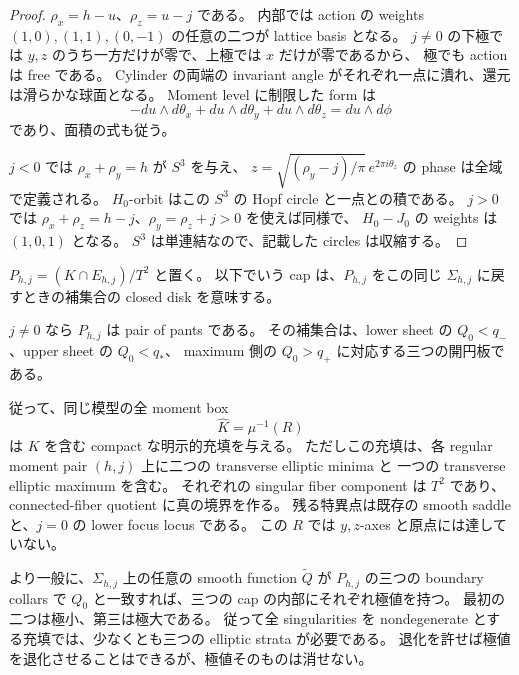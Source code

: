 \begin{proof}
$\rho_x=h-u$、$\rho_z=u-j$ である。
内部では action の weights $(1,0),(1,1),(0,-1)$ の任意の二つが lattice basis となる。
$j\ne0$ の下極では $y,z$ のうち一方だけが零で、上極では $x$ だけが零であるから、
極でも action は free である。
Cylinder の両端の invariant angle がそれぞれ一点に潰れ、還元は滑らかな球面となる。
Moment level に制限した form は
\[
 -du\wedge d\theta_x+du\wedge d\theta_y+du\wedge d\theta_z
 =du\wedge d\phi
\]
であり、面積の式も従う。

$j<0$ では $\rho_x+\rho_y=h$ が $S^3$ を与え、
$z=\sqrt{(\rho_y-j)/\pi}\,e^{2\pi i\theta_z}$ の phase は全域で定義される。
$H_0$-orbit はこの $S^3$ の Hopf circle と一点との積である。
$j>0$ では $\rho_x+\rho_z=h-j$、$\rho_y=\rho_z+j>0$ を使えば同様で、
$H_0-J_0$ の weights は $(1,0,1)$ となる。
$S^3$ は単連結なので、記載した circles は収縮する。
\end{proof}

$P_{h,j}=(K\cap E_{h,j})/T^2$ と置く。
以下でいう cap は、$P_{h,j}$ をこの同じ $\Sigma_{h,j}$ に戻すときの補集合の closed disk を意味する。

\begin{proposition}[明示的な充填と残る極値]\label{cf:three-caps}
$j\ne0$ なら $P_{h,j}$ は pair of pants である。
その補集合は、lower sheet の $Q_0<q_-$、upper sheet の $Q_0<q_*$、
maximum 側の $Q_0>q_+$ に対応する三つの開円板である。

従って、同じ模型の全 moment box
\[
 \widehat K=\mu^{-1}(R)
\]
は $K$ を含む compact な明示的充填を与える。
ただしこの充填は、各 regular moment pair $(h,j)$ 上に二つの transverse elliptic minima と
一つの transverse elliptic maximum を含む。
それぞれの singular fiber component は $T^2$ であり、connected-fiber quotient に真の境界を作る。
残る特異点は既存の smooth saddle と、$j=0$ の lower focus locus である。
この $R$ では $y,z$-axes と原点には達していない。

より一般に、$\Sigma_{h,j}$ 上の任意の smooth function $\widetilde Q$ が
$P_{h,j}$ の三つの boundary collars で $Q_0$ と一致すれば、三つの cap の内部にそれぞれ極値を持つ。
最初の二つは極小、第三は極大である。
従って全 singularities を nondegenerate とする充填では、少なくとも三つの elliptic strata が必要である。
退化を許せば極値を退化させることはできるが、極値そのものは消せない。
\end{proposition}

